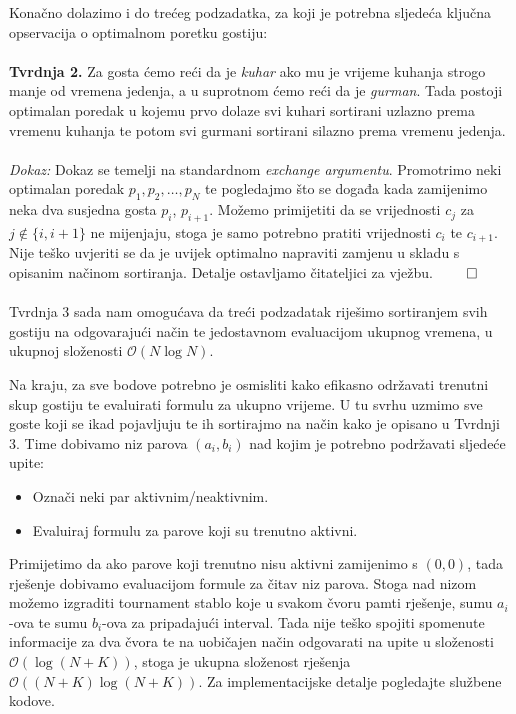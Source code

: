 Konačno dolazimo i do trećeg podzadatka, za koji je potrebna sljedeća ključna opservacija o optimalnom poretku gostiju:
\\\\
\textbf{Tvrdnja 2.} Za gosta ćemo reći da je \textit{kuhar} ako mu je vrijeme kuhanja strogo manje od vremena jedenja, a u suprotnom ćemo reći da je \textit{gurman}. Tada postoji optimalan poredak u kojemu prvo dolaze svi kuhari sortirani uzlazno prema vremenu kuhanja te potom svi gurmani sortirani silazno prema vremenu jedenja.
\\\\
\textit{Dokaz:} Dokaz se temelji na standardnom \textit{exchange argumentu}. Promotrimo neki optimalan poredak $p_1, p_2, \ldots, p_N$ te pogledajmo što se događa kada zamijenimo neka dva susjedna gosta $p_i$, $p_{i+1}$. Možemo primijetiti da se vrijednosti $c_j$ za $j \not \in \{i, i + 1\}$ ne mijenjaju, stoga je samo potrebno pratiti vrijednosti $c_i$ te $c_{i+1}$. Nije teško uvjeriti se da je uvijek optimalno napraviti zamjenu u skladu s opisanim načinom sortiranja. Detalje ostavljamo čitateljici za vježbu. $\qed$
\\\\
Tvrdnja 3 sada nam omogućava da treći podzadatak riješimo sortiranjem svih gostiju na odgovarajući način te jedostavnom evaluacijom ukupnog vremena, u ukupnoj složenosti $\mathcal{O}(N\log N)$.

Na kraju, za sve bodove potrebno je osmisliti kako efikasno održavati trenutni skup gostiju te evaluirati formulu za ukupno vrijeme. U tu svrhu uzmimo sve goste koji se ikad pojavljuju te ih sortirajmo na način kako je opisano u Tvrdnji 3. Time dobivamo niz parova $(a_i, b_i)$ nad kojim je potrebno podržavati sljedeće upite:
\begin{itemize}
    \item Označi neki par aktivnim/neaktivnim.
    \item Evaluiraj formulu za parove koji su trenutno aktivni.
\end{itemize}
Primijetimo da ako parove koji trenutno nisu aktivni zamijenimo s $(0, 0)$, tada rješenje dobivamo evaluacijom formule za čitav niz parova. Stoga nad nizom možemo izgraditi tournament stablo koje u svakom čvoru pamti rješenje, sumu $a_i$-ova te sumu $b_i$-ova za pripadajući interval. Tada nije teško spojiti spomenute informacije za dva čvora te na uobičajen način odgovarati na upite u složenosti $\mathcal{O}(\log (N+K))$, stoga je ukupna složenost rješenja $\mathcal{O}((N + K)\log (N + K))$. Za implementacijske detalje pogledajte službene kodove.
